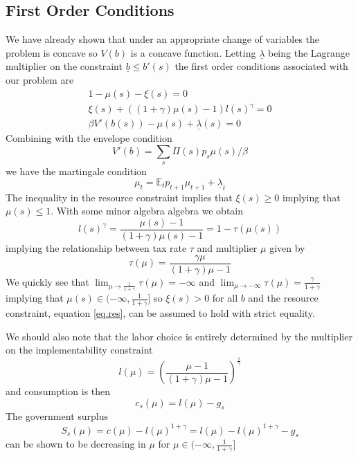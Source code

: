 \documentclass[12pt]{article}
\newcommand{\EE}{\mathbb E}
\begin{document}
\subsection{First Order Conditions}
We have already shown that under an appropriate change of variables the problem is concave so $V(b)$ is a concave function.  Letting $\underline \lambda$ being the Lagrange multiplier on the constraint $\underline b \leq b'(s)$ the first order conditions associated with our problem are
\begin{align}
	1-\mu(s)-\xi(s) = 0\label{eq.foc1}\\
	\xi(s) +((1+\gamma)\mu(s)-1)l(s)^\gamma  = 0\label{eq.foc2}\\
	\beta V'(b(s)) - \mu(s) +\underline \lambda(s) = 0\label{eq.foc3}
\end{align}Combining with the envelope condition 
\[
	V'(b) = \sum_s\Pi(s)p_s\mu(s)/\beta
\] we have the martingale condition
\begin{equation}\label{eq.mart}
	\mu_t = \EE_t p_{t+1}\mu_{t+1}+\underline{\lambda}_t
\end{equation}  The inequality in the resource constraint implies that $\xi(s)\geq 0$ implying that $\mu(s) \leq 1$.  With some minor algebra algebra we obtain
\[
	l(s)^\gamma = \frac{\mu(s)-1}{(1+\gamma)\mu(s) - 1} = 1-\tau(\mu(s))
\]implying the relationship between tax rate $\tau$ and multiplier $\mu$ given by
\begin{equation}\label{eq.tau}
	\tau(\mu) = \frac{\gamma\mu}{(1+\gamma)\mu-1}
\end{equation}  We quickly see that $\lim_{\mu\rightarrow \frac{1}{1+\gamma}} \tau(\mu) = -\infty$ and $\lim_{\mu\rightarrow-\infty} \tau(\mu) = \frac{\gamma}{1+\gamma}$ implying that $\mu(s)\in (-\infty,\frac1{1+\gamma}]$ so $\xi(s) > 0$ for all $b$ and the resource constraint, equation \eqref{eq.res}, can be assumed to hold with strict equality.

We should also note that the labor choice is entirely determined by the multiplier on the implementability constraint
\begin{equation}\label{eq.l_mu}
	l(\mu) = \left(\frac{\mu-1}{(1+\gamma)\mu - 1}\right)^\frac1\gamma
\end{equation} and consumption is then
\[
	c_s(\mu) = l(\mu) - g_s
\]  The government surplus 
\begin{equation}\label{eq.S}
	S_s(\mu) = c(\mu) -l(\mu)^{1+\gamma}= l(\mu)-l(\mu)^{1+\gamma} - g_s
\end{equation} can be shown to be decreasing in $\mu$ for $\mu\in(-\infty,\frac1{1+\gamma}]$
\end{document}
